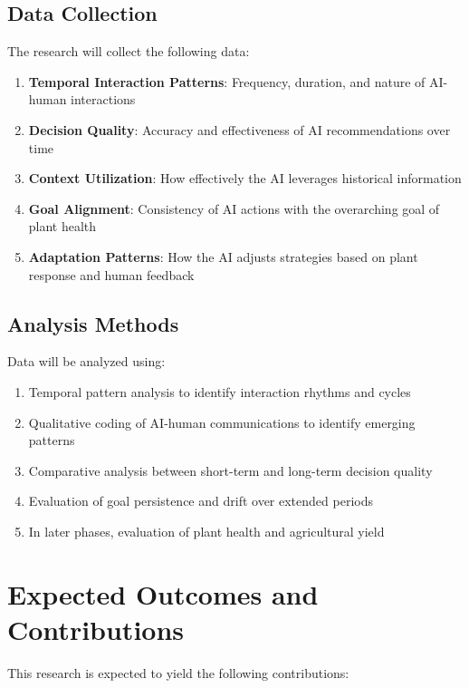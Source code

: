 \documentclass[12pt,letterpaper]{article}
\begin{document}
\subsection{Data Collection}

The research will collect the following data:

\begin{enumerate}
    \item \textbf{Temporal Interaction Patterns}: Frequency, duration, and nature of AI-human interactions
    \item \textbf{Decision Quality}: Accuracy and effectiveness of AI recommendations over time
    \item \textbf{Context Utilization}: How effectively the AI leverages historical information
    \item \textbf{Goal Alignment}: Consistency of AI actions with the overarching goal of plant health
    \item \textbf{Adaptation Patterns}: How the AI adjusts strategies based on plant response and human feedback
\end{enumerate}

\subsection{Analysis Methods}

Data will be analyzed using:

\begin{enumerate}
    \item Temporal pattern analysis to identify interaction rhythms and cycles
    \item Qualitative coding of AI-human communications to identify emerging patterns
    \item Comparative analysis between short-term and long-term decision quality
    \item Evaluation of goal persistence and drift over extended periods
    \item In later phases, evaluation of plant health and agricultural yield
\end{enumerate}

\section{Expected Outcomes and Contributions}

This research is expected to yield the following contributions:
\end{document}

